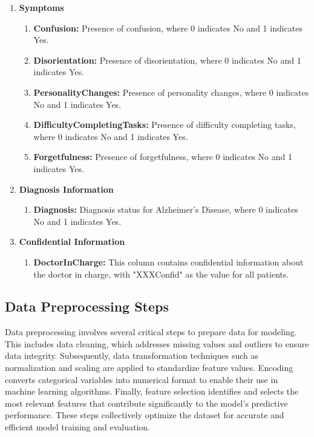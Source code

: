 \documentclass[a4paper,12pt]{report}
\begin{document}
\begin {enumerate}
\item\textbf{Symptoms}
\begin {enumerate}[label=\roman*]
    \item \textbf{Confusion:} Presence of confusion, where 0 indicates No and 1 indicates Yes.
    \item \textbf{Disorientation:} Presence of disorientation, where 0 indicates No and 1 indicates Yes.
    \item \textbf{PersonalityChanges:} Presence of personality changes, where 0 indicates No and 1 indicates Yes.
    \item \textbf{DifficultyCompletingTasks:} Presence of difficulty completing tasks, where 0 indicates No and 1 indicates Yes.
    \item \textbf{Forgetfulness:} Presence of forgetfulness, where 0 indicates No and 1 indicates Yes.
\end{enumerate}

\item\textbf{Diagnosis Information}
\begin {enumerate}[label=\roman*]
\item\textbf{Diagnosis:} Diagnosis status for Alzheimer's Disease, where 0 indicates No and 1 indicates Yes.
\end{enumerate}
\item\textbf{Confidential Information}
\begin {enumerate}[label=\roman*]
\item\textbf{DoctorInCharge:} This column contains confidential information about the doctor in charge, with "XXXConfid" as the value for all patients.
\end{enumerate}
\end{enumerate}

\subsection{Data Preprocessing Steps}
Data preprocessing involves several critical steps to prepare data for modeling. This includes data cleaning, which addresses missing values and outliers to ensure data integrity. Subsequently, data transformation techniques such as normalization and scaling are applied to standardize feature values. Encoding converts categorical variables into numerical format to enable their use in machine learning algorithms. Finally, feature selection identifies and selects the most relevant features that contribute significantly to the model's predictive performance. These steps collectively optimize the dataset for accurate and efficient model training and evaluation.
\end{document}
